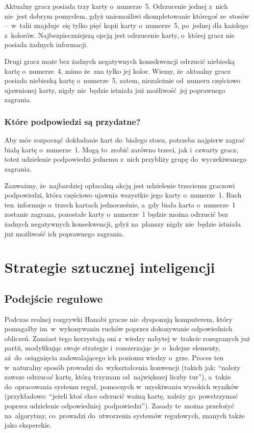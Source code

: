 \documentclass[declaration,shortabstract,inz]{iithesis}
\begin{document}
Aktualny gracz posiada trzy karty o~numerze~5. Odrzucenie jednej z~nich nie~jest dobrym pomysłem, gdyż uniemożliwi skompletowanie któregoś ze~stosów --~w~talii znajduje~się tylko pięć kopii karty o~numerze~5, po~jednej dla każdego z~kolorów. Najbezpieczniejszą opcją jest odrzucenie karty, o~której gracz nie posiada żadnych informacji.

Drugi gracz może bez żadnych negatywnych konsekwencji odrzucić niebieską kartę o~numerze~4, mimo że~zna tylko jej kolor. Wiemy, że~aktualny gracz posiada niebieską kartę o~numerze~5, zatem, niezależnie od~numeru częściowo ujawnionej karty, nigdy nie~będzie istniała już możliwość jej poprawnego zagrania.

\subsection*{Które podpowiedzi są przydatne?}

Aby móc rozpocząć dokładanie kart do~białego stosu, potrzeba najpierw zagrać białą kartę o~numerze~1. Mogą to~zrobić zarówno trzeci, jak i~czwarty gracz, toteż udzielenie podpowiedzi jednemu z~nich przybliży grupę do~wyczekiwanego zagrania.

Zauważmy, że~najbardziej opłacalną akcją jest udzielenie trzeciemu graczowi podpowiedzi, która częściowo ujawnia wszystkie jego karty o~numerze~1. Ruch ten~informuje o~trzech kartach jednocześnie, a~gdy biała karta o~numerze~1 zostanie zagrana, pozostałe karty o~numerze~1 będzie można odrzucić bez żadnych negatywnych konsekwencji, gdyż na~planszy nigdy nie~będzie istniała już możliwość ich poprawnego zagrania.

\chapter{Strategie sztucznej inteligencji}

\section{Podejście regułowe}

Podczas realnej rozgrywki Hanabi gracze nie~dysponują komputerem, który pomagałby im~w~wykonywaniu ruchów poprzez dokonywanie odpowiednich obliczeń. Zamiast tego korzystają oni z~wiedzy nabytej w~trakcie rozegranych już partii, modyfikując swoje strategie i~rozszerzając je~o~kolejne elementy, aż~do~osiągnięcia zadowalającego ich poziomu wiedzy o~grze. Proces ten w~naturalny sposób prowadzi do~wykształcenia konwencji (takich jak: ``należy zawsze odrzucać kartę, którą trzymam od~największej liczby tur''), a~także do~opracowania systemu reguł, pomocnych w~uzyskiwaniu wysokich wyników (przykładowo: ``jeżeli ktoś chce odrzucić ważną kartę, należy go~powstrzymać poprzez udzielenie odpowiedniej podpowiedzi''). Zasady te~można przełożyć na~algorytmy, co~prowadzi do~utworzenia systemów regułowych, znanych także jako eksperckie.
\end{document}
